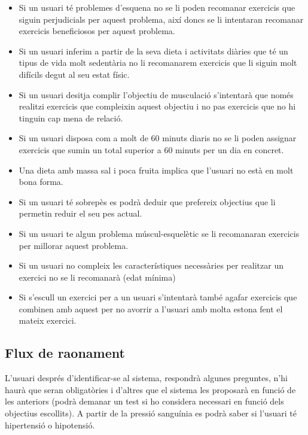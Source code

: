 \documentclass[a4paper, 12pt, UTF8]{article}
\begin{document}
\begin{itemize}
	\item Si un usuari té problemes d'esquena no se li poden recomanar exercicis que siguin perjudicials per aquest problema, així doncs se li intentaran recomanar exercicis beneficiosos per aquest problema.
	
	\item Si un usuari inferim a partir de la seva dieta i activitats diàries que té un tipus de vida molt sedentària no li recomanarem exercicis que li siguin molt difícils degut al seu estat físic.
	
	\item Si un usuari desitja complir l'objectiu de musculació s'intentarà que només realitzi exercicis que compleixin aquest objectiu i no pas exercicis que no hi tinguin cap mena de relació.
	
	\item Si un usuari disposa com a molt de 60 minuts diaris no se li poden assignar exercicis que sumin un total superior a 60 minuts per un dia en concret.
	
	\item Una dieta amb massa sal i poca fruita implica que l'usuari no està en molt bona forma.
	
	\item Si un usuari té sobrepès es podrà deduir que prefereix objectius que li permetin reduir el seu pes actual.
	
	\item Si un usuari te algun problema múscul-esquelètic se li recomanaran exercicis per millorar aquest problema.
	
	\item Si un usuari no compleix les característiques necessàries per realitzar un exercici no se li recomanarà (edat mínima)
	
	\item Si s'escull un exercici per a un usuari s'intentarà també agafar exercicis que combinen amb aquest per no avorrir a l'usuari amb molta estona fent el mateix exercici.
\end{itemize}

\subsection{Flux de raonament}

L'usuari després d'identificar-se al sistema, respondrà algunes preguntes, n'hi haurà que seran obligatòries i d'altres que el sistema les proposarà en funció de les anteriors (podrà demanar un test si ho considera necessari en funció dels objectius escollits). A partir de la pressió sanguínia es podrà saber si l'usuari té hipertensió o hipotensió.
\end{document}
